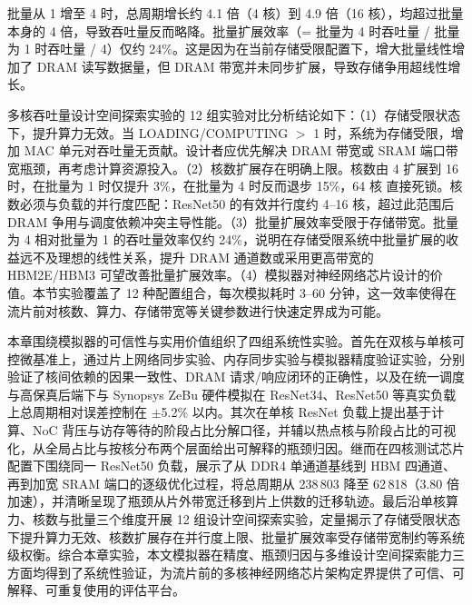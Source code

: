 批量从 1 增至 4 时，总周期增长约 4.1 倍（4 核）到 4.9 倍（16 核），均超过批量本身的 4 倍，导致吞吐量反而略降。批量扩展效率（= 批量为 4 时吞吐量 / 批量为 1 时吞吐量 / 4）仅约 24\%。这是因为在当前存储受限配置下，增大批量线性增加了 DRAM 读写数据量，但 DRAM 带宽并未同步扩展，导致存储争用超线性增长。


多核吞吐量设计空间探索实验的 12 组实验对比分析结论如下：（1）存储受限状态下，提升算力无效。当 LOADING/COMPUTING $>$ 1 时，系统为存储受限，增加 MAC 单元对吞吐量无贡献。设计者应优先解决 DRAM 带宽或 SRAM 端口带宽瓶颈，再考虑计算资源投入。（2）核数扩展存在明确上限。核数由 4 扩展到 16 时，在批量为 1 时仅提升 3\%，在批量为 4 时反而退步 15\%，64 核 直接死锁。核数必须与负载的并行度匹配：ResNet50 的有效并行度约 4--16 核，超过此范围后 DRAM 争用与调度依赖冲突主导性能。（3）批量扩展效率受限于存储带宽。批量为 4 相对批量为 1 的吞吐量效率仅约 24\%，说明在存储受限系统中批量扩展的收益远不及理想的线性关系，提升 DRAM 通道数或采用更高带宽的 HBM2E/HBM3 可望改善批量扩展效率。（4）模拟器对神经网络芯片设计的价值。本节实验覆盖了 12 种配置组合，每次模拟耗时 3--60 分钟，这一效率使得在流片前对核数、算力、存储带宽等关键参数进行快速定界成为可能。


本章围绕模拟器的可信性与实用价值组织了四组系统性实验。首先在双核与单核可控微基准上，通过片上网络同步实验、内存同步实验与模拟器精度验证实验，分别验证了核间依赖的因果一致性、DRAM 请求/响应闭环的正确性，以及在统一调度与高保真后端下与 Synopsys ZeBu 硬件模拟在 ResNet34、ResNet50 等真实负载上总周期相对误差控制在 $\pm$5.2\% 以内。其次在单核 ResNet 负载上提出基于计算、NoC 背压与访存等待的阶段占比分解口径，并辅以热点核与阶段占比的可视化，从全局占比与按核分布两个层面给出可解释的瓶颈归因。继而在四核测试芯片配置下围绕同一 ResNet50 负载，展示了从 DDR4 单通道基线到 HBM 四通道、再到加宽 SRAM 端口的逐级优化过程，将总周期从 238\,803 降至 62\,818（3.80 倍加速），并清晰呈现了瓶颈从片外带宽迁移到片上供数的迁移轨迹。最后沿单核算力、核数与批量三个维度开展 12 组设计空间探索实验，定量揭示了存储受限状态下提升算力无效、核数扩展存在并行度上限、批量扩展效率受存储带宽制约等系统级权衡。综合本章实验，本文模拟器在精度、瓶颈归因与多维设计空间探索能力三方面均得到了系统性验证，为流片前的多核神经网络芯片架构定界提供了可信、可解释、可重复使用的评估平台。
